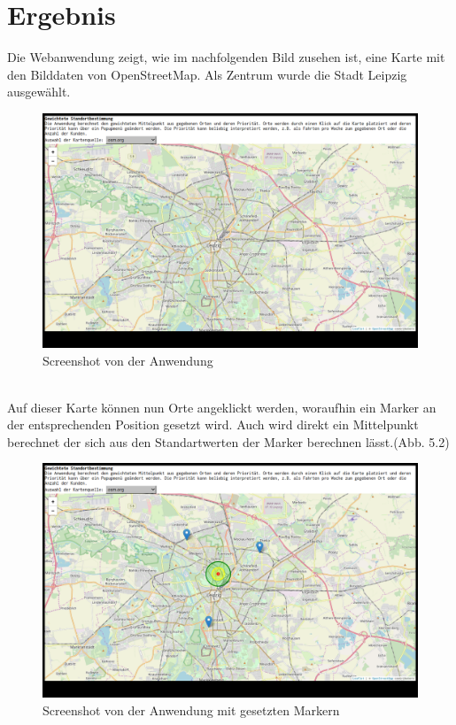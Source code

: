 \documentclass[a4paper, 12pt]{scrreprt}
\begin{document}
\chapter{Ergebnis}
Die Webanwendung zeigt, wie im nachfolgenden Bild zusehen ist, eine Karte mit den Bilddaten von OpenStreetMap. Als Zentrum wurde die Stadt Leipzig ausgewählt.\\
\begin{figure}[h]
\includegraphics[width=\linewidth]{bell1_1.png}
\caption{Screenshot von der Anwendung}
\end{figure}\\
Auf dieser Karte können nun Orte angeklickt werden, woraufhin ein Marker an der entsprechenden Position gesetzt wird. Auch wird direkt ein Mittelpunkt berechnet der sich aus den Standartwerten der Marker berechnen lässt.(Abb. 5.2)\\
\begin{figure}[h]
\includegraphics[width=\linewidth]{bell2_1.png}
\caption{Screenshot von der Anwendung mit gesetzten Markern}
\end{figure}
\end{document}
